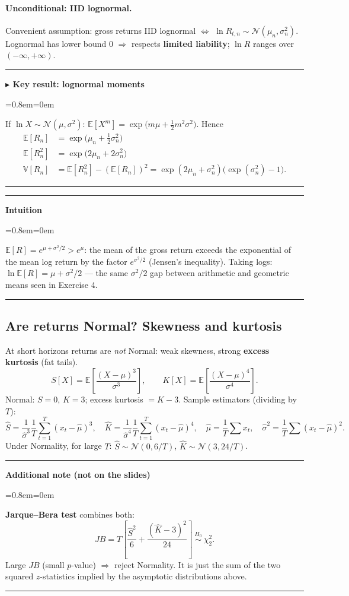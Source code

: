 \documentclass[11pt,a4paper]{report}
\newenvironment{notebox}[1]
  {\par\medskip\Needspace{6\baselineskip}\noindent\rule{\linewidth}{0.4pt}\par\nopagebreak
   \noindent\textbf{#1}\par\nopagebreak
   \begin{list}{}{\leftmargin=0.8em\rightmargin=0em\topsep=2pt}\item[]}
  {\end{list}\nopagebreak\noindent\rule{\linewidth}{0.4pt}\par\medskip}
\newenvironment{keybox}[1][]{\begin{notebox}{$\blacktriangleright$ Key result#1}}{\end{notebox}}
\newenvironment{intuition}{\begin{notebox}{Intuition}}{\end{notebox}}
\newenvironment{addnote}{\begin{notebox}{Additional note (not on the slides)}}{\end{notebox}}
\newcommand{\E}{\mathbb{E}}
\newcommand{\V}{\mathbb{V}}
\begin{document}
\paragraph{Unconditional: IID lognormal.} Convenient assumption: gross returns
IID lognormal $\Leftrightarrow$ $\ln R_{t,n}\sim\mathcal N(\mu_n,\sigma_n^2)$.
Lognormal has lower bound 0 $\Rightarrow$ respects \textbf{limited liability};
$\ln R$ ranges over $(-\infty,+\infty)$.

\begin{keybox}[: lognormal moments]
If $\ln X\sim\mathcal N(\mu,\sigma^2)$: \quad
$\E[X^m]=\exp\!\big(m\mu+\tfrac12 m^2\sigma^2\big)$. Hence
\begin{align*}
\E[R_n] &= \exp\!\big(\mu_n+\tfrac12\sigma_n^2\big)\\
\E[R_n^2] &= \exp\!\big(2\mu_n+2\sigma_n^2\big)\\
\V[R_n] &= \E[R_n^2]-(\E[R_n])^2=\exp(2\mu_n+\sigma_n^2)\big(\exp(\sigma_n^2)-1\big).
\end{align*}
\end{keybox}
\begin{intuition}
$\E[R]=e^{\mu+\sigma^2/2}>e^{\mu}$: the mean of the gross return exceeds the
exponential of the mean log return by the factor $e^{\sigma^2/2}$ (Jensen's
inequality). Taking logs: $\ln\E[R]=\mu+\sigma^2/2$ --- the same
$\sigma^2/2$ gap between arithmetic and geometric means seen in Exercise 4.
\end{intuition}

\subsection{Are returns Normal? Skewness and kurtosis}
At short horizons returns are \emph{not} Normal: weak skewness, strong
\textbf{excess kurtosis} (fat tails).
\[
S[X]=\E\!\left[\frac{(X-\mu)^3}{\sigma^3}\right],\qquad
K[X]=\E\!\left[\frac{(X-\mu)^4}{\sigma^4}\right].
\]
Normal: $S=0$, $K=3$; excess kurtosis $=K-3$. Sample estimators (dividing by $T$):
\[
\hat S=\frac{1}{\hat\sigma^3}\frac1T\sum_{t=1}^T(x_t-\hat\mu)^3,\quad
\hat K=\frac{1}{\hat\sigma^4}\frac1T\sum_{t=1}^T(x_t-\hat\mu)^4,\quad
\hat\mu=\frac1T\sum x_t,\quad \hat\sigma^2=\frac1T\sum(x_t-\hat\mu)^2.
\]
Under Normality, for large $T$: $\hat S\sim\mathcal N(0,6/T)$,
$\hat K\sim\mathcal N(3,24/T)$.

\begin{addnote}
\textbf{Jarque--Bera test} combines both:
\[
JB=T\left[\frac{\hat S^2}{6}+\frac{(\hat K-3)^2}{24}\right]\ \overset{H_0}{\sim}\ \chi^2_2 .
\]
Large $JB$ (small $p$-value) $\Rightarrow$ reject Normality. It is just the sum
of the two squared $z$-statistics implied by the asymptotic distributions above.
\end{addnote}
\end{document}
